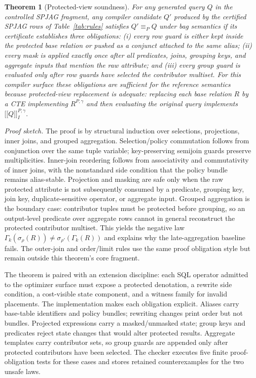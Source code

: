 \documentclass[conference]{IEEEtran}
\newcommand{\ctx}{\gamma}
\newcommand{\sem}[1]{\mathopen{[\![}#1\mathclose{]\!]}}
\newcommand{\prot}[1]{#1^{P,\ctx}}
\newtheorem{theorem}{Theorem}
\begin{document}
\begin{theorem}[Protected-view soundness]
For any generated query $Q$ in the controlled SPJAG fragment, any compiler candidate $Q'$ produced by the certified SPJAG rows of Table~\ref{tab:rules} satisfies $Q' \equiv_P Q$ under bag semantics if its certificate establishes three obligations: (i) every row guard is either kept inside the protected base relation or pushed as a conjunct attached to the same alias; (ii) every mask is applied exactly once after all predicates, joins, grouping keys, and aggregate inputs that mention the raw attribute; and (iii) every group guard is evaluated only after row guards have selected the contributor multiset. For this compiler surface these obligations are sufficient for the reference semantics because protected-view replacement is adequate: replacing each base relation $R$ by a CTE implementing $\prot{R}$ and then evaluating the original query implements $\sem{Q}^{P,\ctx}_I$.
\end{theorem}

\textit{Proof sketch.} The proof is by structural induction over selections, projections, inner joins, and grouped aggregation. Selection/policy commutation follows from conjunction over the same tuple variable; key-preserving semijoin guards preserve multiplicities. Inner-join reordering follows from associativity and commutativity of inner joins, with the nonstandard side condition that the policy bundle remains alias-stable. Projection and masking are safe only when the raw protected attribute is not subsequently consumed by a predicate, grouping key, join key, duplicate-sensitive operator, or aggregate input. Grouped aggregation is the boundary case: contributor tuples must be protected before grouping, so an output-level predicate over aggregate rows cannot in general reconstruct the protected contributor multiset. This yields the negative law $\Gamma_k(\sigma_{\rho}(R)) \neq \sigma_{\rho'}(\Gamma_k(R))$ and explains why the late-aggregation baseline fails. The outer-join and order/limit rules use the same proof obligation style but remain outside this theorem's core fragment.

The theorem is paired with an extension discipline: each SQL operator admitted to the optimizer surface must expose a protected denotation, a rewrite side condition, a cost-visible state component, and a witness family for invalid placements. The implementation makes each obligation explicit. Aliases carry base-table identifiers and policy bundles; rewriting changes print order but not bundles. Projected expressions carry a masked/unmasked state; group keys and predicates reject state changes that would alter protected results. Aggregate templates carry contributor sets, so group guards are appended only after protected contributors have been selected. The checker executes five finite proof-obligation tests for these cases and stores retained counterexamples for the two unsafe laws.
\end{document}

